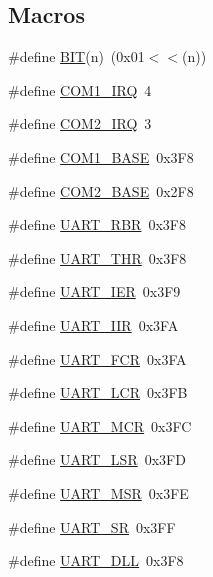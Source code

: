 \subsection*{Macros}
\begin{DoxyCompactItemize}
\item 
\#define \mbox{\hyperlink{group__uart_ga3a8ea58898cb58fc96013383d39f482c}{B\+IT}}(n)~(0x01$<$$<$(n))
\item 
\#define \mbox{\hyperlink{group__uart_ga3685c78b9bd6dd0fa3861807e24a4e1b}{C\+O\+M1\+\_\+\+I\+RQ}}~4
\item 
\#define \mbox{\hyperlink{group__uart_gab02d84052a299a0c207a8ea4c1a5636d}{C\+O\+M2\+\_\+\+I\+RQ}}~3
\item 
\#define \mbox{\hyperlink{group__uart_gaba29c0d1b675ad323c7a3ab4b83a918d}{C\+O\+M1\+\_\+\+B\+A\+SE}}~0x3\+F8
\item 
\#define \mbox{\hyperlink{group__uart_ga5489a47a256541da88635eec975468f8}{C\+O\+M2\+\_\+\+B\+A\+SE}}~0x2\+F8
\item 
\#define \mbox{\hyperlink{group__uart_ga3eb7d5a767dae7774aa2b4be28e20a7e}{U\+A\+R\+T\+\_\+\+R\+BR}}~0x3\+F8
\item 
\#define \mbox{\hyperlink{group__uart_ga7a676f075475e46d27eb878977b867ec}{U\+A\+R\+T\+\_\+\+T\+HR}}~0x3\+F8
\item 
\#define \mbox{\hyperlink{group__uart_gaaf7aaa372e86b3aa99e6c78242be2722}{U\+A\+R\+T\+\_\+\+I\+ER}}~0x3\+F9
\item 
\#define \mbox{\hyperlink{group__uart_ga16add7e6b9f91a6698c5910704111b68}{U\+A\+R\+T\+\_\+\+I\+IR}}~0x3\+FA
\item 
\#define \mbox{\hyperlink{group__uart_ga220a678f91ca8244b30fe813200c26c1}{U\+A\+R\+T\+\_\+\+F\+CR}}~0x3\+FA
\item 
\#define \mbox{\hyperlink{group__uart_ga36c30861e332468c7f1998648e706740}{U\+A\+R\+T\+\_\+\+L\+CR}}~0x3\+FB
\item 
\#define \mbox{\hyperlink{group__uart_ga8ef39bc0942ddd0411d87001d12224f4}{U\+A\+R\+T\+\_\+\+M\+CR}}~0x3\+FC
\item 
\#define \mbox{\hyperlink{group__uart_ga0f8ac527073d763bac90daba987361c6}{U\+A\+R\+T\+\_\+\+L\+SR}}~0x3\+FD
\item 
\#define \mbox{\hyperlink{group__uart_ga71067c48bdde7dc6c5d0a1c56746e776}{U\+A\+R\+T\+\_\+\+M\+SR}}~0x3\+FE
\item 
\#define \mbox{\hyperlink{group__uart_ga88135060cd7c85ef5c49d605ea9b4cae}{U\+A\+R\+T\+\_\+\+SR}}~0x3\+FF
\item 
\#define \mbox{\hyperlink{group__uart_ga7ff21e0cfc73a2db80c3907c5cac5a61}{U\+A\+R\+T\+\_\+\+D\+LL}}~0x3\+F8
$$
\end{DoxyCompactItemize}
